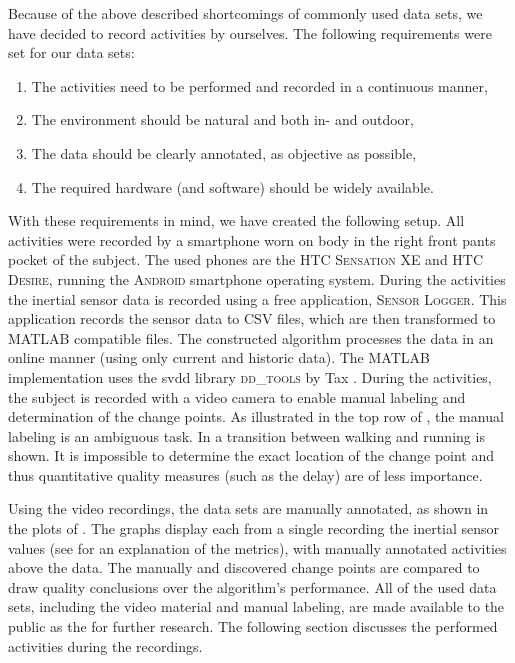 Because of the above described shortcomings of commonly used data sets, we have decided to record activities by ourselves.
The following requirements were set for our data sets:
\begin{enumerate}
  \item The activities need to be performed and recorded in a continuous manner,
  \item The environment should be natural and both in- and outdoor,
  \item The data should be clearly annotated, as objective as possible,
  \item The required hardware (and software) should be widely available.
\end{enumerate}

With these requirements in mind, we have created the following setup.
All activities were recorded by a smartphone worn on body in the right front pants pocket of the subject.
The used phones are the \textsc{HTC Sensation XE} and \textsc{HTC Desire}, running the \textsc{Android} smartphone operating system.
During the activities the inertial sensor data is recorded using a free application, \textsc{Sensor Logger}.
This application records the sensor data to \textsc{CSV} files, which are then transformed to \textsc{MATLAB} compatible files.
The constructed algorithm processes the data in an online manner (using only current and historic data).
The \textsc{MATLAB} implementation uses the \gls{svdd} library \textsc{dd\_tools} by Tax \cite{Ddtools2013}.
During the activities, the subject is recorded with a video camera to enable manual labeling and determination of the change points.
As illustrated in the top row of , the manual labeling is an ambiguous task.
In  a transition between walking and running is shown.
It is impossible to determine the exact location of the change point and thus quantitative quality measures (such as the delay) are of less importance.

Using the video recordings, the data sets are manually annotated, as shown in the plots of .
The graphs display each from a single recording the inertial sensor values (see  for an explanation of the metrics), with manually annotated activities above the data.
The manually and discovered change points are compared to draw quality conclusions over the algorithm's performance.
All of the used data sets, including the video material and manual labeling, are made available to the public as the  \cite{vlasveld2014acras} for further research.
The following section discusses the performed activities during the recordings.

